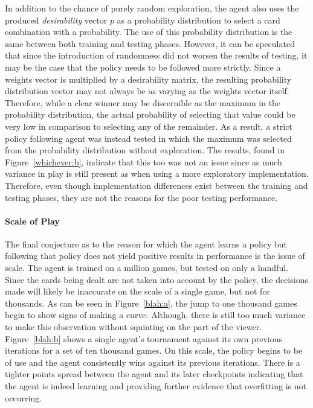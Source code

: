 In addition to the chance of purely random exploration,
the agent also uses the produced \textit{desirability} vector $p$
as a probability distribution to select a card combination with a probability.
%
The use of this probability distribution is the same between both training 
and testing phases.
%
However,
it can be speculated that since the introduction of randomness did not worsen
the results of testing,
it may be the case that the policy needs to be followed more strictly.
%
Since a weights vector is multiplied by a desirability matrix,
the resulting probability distribution vector may not always be as
varying as the weights vector itself.
%
Therefore,
while a clear winner may be discernible as the maximum in the probability
distribution,
the actual probability of selecting that value could be very low in comparison
to selecting any of the remainder.
%
As a result,
a strict policy following agent was instead tested in which the maximum was
selected from the probability distribution without exploration.
%
The results,
found in Figure~\ref{whichever:b},
indicate that this too was not an issue
since as much variance in play is still present as when using a more exploratory
implementation.
%
Therefore,
even though implementation differences exist between the training and testing
phases,
they are not the reasons for the poor testing performance.


\paragraph{Scale of Play}

The final conjecture as to the reason for which the agent learns a policy
but following that policy does not yield positive results in performance
is the issue of scale.
%
The agent is trained on a million games,
but tested on only a handful.
%
Since the cards being dealt are not taken into account by the policy,
the decisions made will likely be inaccurate on the scale of a single game,
but not for thousands.
%
As can be seen in Figure~\ref{blah:a},
the jump to one thousand games begin to show signs of making a curve.
%
Although,
there is still too much variance to make this observation without squinting
on the part of the viewer.
%
Figure~\ref{blah:b} shows a single agent's tournament against its own previous
iterations for a set of ten thousand games.
%
On this scale,
the policy begins to be of use
and the agent consistently wins against its previous iterations.
%
There is a tighter points spread between the agent and its later checkpoints
indicating that the agent is indeed learning and
providing further evidence that overfitting is not occurring.

